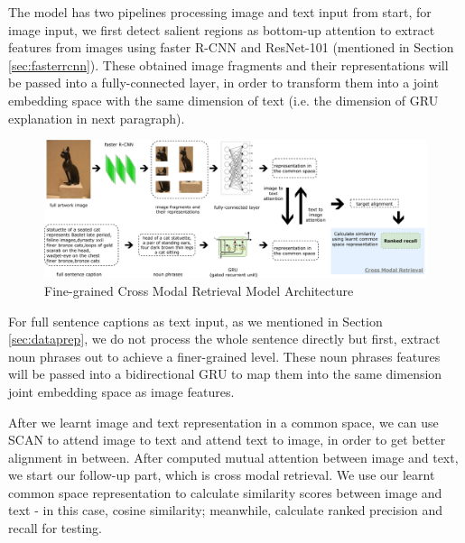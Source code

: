 The model has two pipelines processing image and text input from start, for image input, we first detect salient regions as bottom-up attention \cite{bottomup} to extract features from images using faster R-CNN \cite{fasterrcnn} and ResNet-101 \cite{resnet} (mentioned in Section \ref{sec:fasterrcnn}). These obtained image fragments and their representations will be passed into a fully-connected layer, in order to transform them into a joint embedding space with the same dimension of text (i.e. the dimension of GRU explanation in next paragraph).

\begin{figure}[h!]
\centering
\includegraphics[width=1.0\textwidth]{archinew.pdf}
\caption{Fine-grained Cross Modal Retrieval Model Architecture}
\label{fig:mainarch}
\end{figure}


For full sentence captions as text input, as we mentioned in Section \ref{sec:dataprep}, we do not process the whole sentence directly but first, extract noun phrases out to achieve a finer-grained level. These noun phrases features will be passed into a bidirectional GRU to map them into the same dimension joint embedding space as image features. 

After we learnt image and text representation in a common space, we can use SCAN to attend image to text and attend text to image, in order to get better alignment in between. After computed mutual attention between image and text, we start our follow-up part, which is cross modal retrieval. We use our learnt common space representation to calculate similarity scores between image and text - in this case, cosine similarity; meanwhile, calculate ranked precision and recall for testing.

